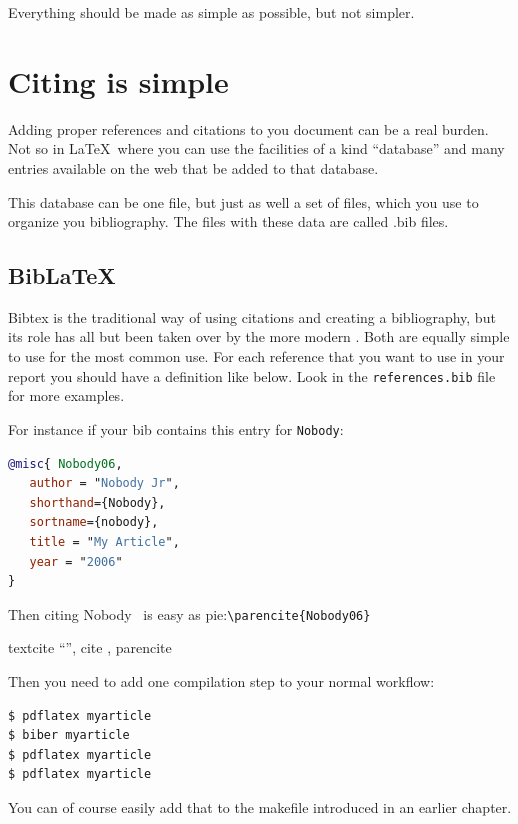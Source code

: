 \renewcommand\TheFile{ch08_citingsimple.tex}

\begin{savequote}[15cm]
  \raggedleft
\sffamily
Everything should be made as simple as possible, but not simpler.
\end{savequote}
\chapter{Citing is simple}

Adding proper references and citations to you document can be a real
burden.
Not so in \LaTeX\ where you can use the facilities of a kind ``database''
and many entries available on the web that be added to that database.

This database can be one file, but just as well a set of files, which
you use to organize you bibliography. The files with these data are
called .bib files. 

\section{Bib\LaTeX}
Bibtex is the traditional way of using citations and creating a bibliography, but its
role has all but been taken over by the more modern \BibLaTeX.
Both are equally simple to use for the most common use. For each reference that you want to use in your report
you should have a definition like below. Look in the \texttt{references.bib} file for more examples.

For instance if your bib contains this entry for \texttt{Nobody}:
\begin{lstlisting}[language=BibTeX]
@misc{ Nobody06,
   author = "Nobody Jr",
   shorthand={Nobody},
   sortname={nobody},
   title = "My Article",
   year = "2006"
}
\end{lstlisting}
\lstset{language=BibTeX}
Then citing Nobody~\parencite{Nobody06} is easy as
pie:\lstinline|\parencite{Nobody06}|

textcite ``\textcite{Nobody06}'', cite \cite{Nobody06}, parencite \parencite{Nobody06}

Then you need to add one compilation step to your normal workflow:

\begin{lstlisting}[language=sh]
$ pdflatex myarticle
$ biber myarticle
$ pdflatex myarticle
$ pdflatex myarticle
\end{lstlisting}

You can of course easily add that to the makefile introduced in an
earlier chapter.

